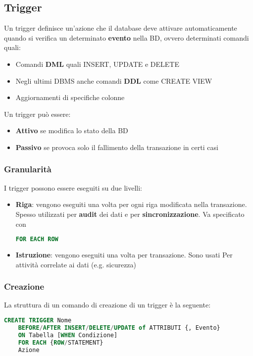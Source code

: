 \subsection{Trigger}
Un trigger definisce un’azione che il database deve attivare automaticamente quando si verifica un determinato \textbf{evento} nella BD, ovvero determinati comandi quali:
\begin{itemize}
	\item Comandi \textbf{DML} quali INSERT, UPDATE e DELETE
	\item Negli ultimi DBMS anche comandi \textbf{DDL} come CREATE VIEW
	\item Aggiornamenti di specifiche colonne
\end{itemize}
Un trigger può essere:
\begin{itemize}
	\item \textbf{Attivo} se modifica lo stato della BD
	\item \textbf{Passivo} se provoca solo il fallimento della transazione in certi casi
\end{itemize}

\subsubsection{Granularità}
I trigger possono essere eseguiti su due livelli:
\begin{itemize}
	\item \textbf{Riga}: vengono eseguiti una volta per ogni riga modificata nella transazione. Spesso utilizzati per \textbf{audit} dei dati e per \textbf{sincronizzazione}. Va specificato con
	\begin{lstlisting}[language=SQL]
		FOR EACH ROW
	\end{lstlisting}
	\item \textbf{Istruzione}: vengono eseguiti una volta per transazione. Sono usati Per attività correlate ai dati (e.g. sicurezza)
\end{itemize}

\subsubsection{Creazione}
La struttura di un comando di creazione di un trigger è la seguente:
\begin{lstlisting}[language=SQL]
	CREATE TRIGGER Nome
	BEFORE/AFTER INSERT/DELETE/UPDATE of ATTRIBUTI {, Evento}
	ON Tabella [WHEN Condizione]
	FOR EACH {ROW/STATEMENT}
	Azione
\end{lstlisting}


